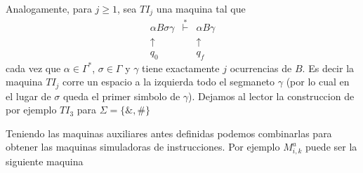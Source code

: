\begin{frame}
  Analogamente, para $j\geq 1$, sea $TI_{j}$ una maquina tal que%
  \begin{equation*}
  \begin{array}{ccc}
  \alpha B\sigma \gamma  & \overset{\ast }{\vdash } & \alpha B\gamma  \\
  \uparrow \  &  & \uparrow  \\
  q_{0}\ \  &  & q_{f}%
  \end{array}%
  \end{equation*}%
  cada vez que $\alpha \in \Gamma ^{\ast }$, $\sigma \in \Gamma $ y $\gamma $
  tiene exactamente $j$ ocurrencias de $B$. Es decir la maquina $TI_{j}$ corre
  un espacio a la izquierda todo el segmaneto $\gamma $ (por lo cual en el
  lugar de $\sigma $ queda el primer simbolo de $\gamma $). Dejamos al lector
  la construccion de por ejemplo $TI_{3}$ para $\Sigma =\{\&,\#\}$

  Teniendo las maquinas auxiliares antes definidas podemos combinarlas para
  obtener las maquinas simuladoras de instrucciones. Por ejemplo $M_{i,k}^{a}$
  puede ser la siguiente maquina
\end{frame}
